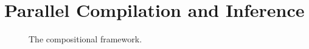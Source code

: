 

\section{Parallel Compilation and Inference}
\label{sec:parallel}


\begin{figure}[!t]
    \centering
    \scalebox{0.6}{
        
    }
    \caption{The compositional framework.}
    \label{fig:frameworkoverview}
\end{figure}


